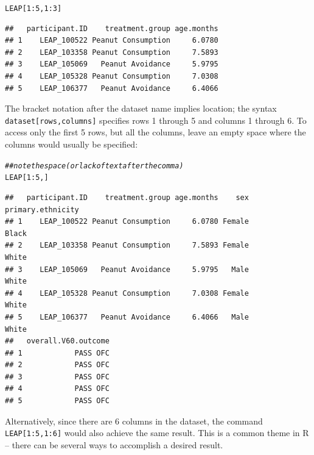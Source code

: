 \documentclass{report}\usepackage[]{graphicx}\usepackage[]{color}
\makeatletter
\newcommand{\hlnum}[1]{\textcolor[rgb]{0.686,0.059,0.569}{#1}}%
\newcommand{\hlcom}[1]{\textcolor[rgb]{0.678,0.584,0.686}{\textit{#1}}}%
\newcommand{\hlopt}[1]{\textcolor[rgb]{0,0,0}{#1}}%
\newcommand{\hlstd}[1]{\textcolor[rgb]{0.345,0.345,0.345}{#1}}%
\newenvironment{kframe}{%
 \def\at@end@of@kframe{}%
 \ifinner\ifhmode%
  \def\at@end@of@kframe{\end{minipage}}%
  \begin{minipage}{\columnwidth}%
 \fi\fi%
 \def\FrameCommand##1{\hskip\@totalleftmargin \hskip-\fboxsep
 \colorbox{shadecolor}{##1}\hskip-\fboxsep
     \hskip-\linewidth \hskip-\@totalleftmargin \hskip\columnwidth}%
 \MakeFramed {\advance\hsize-\width
   \@totalleftmargin\z@ \linewidth\hsize
   \@setminipage}}%
 {\par\unskip\endMakeFramed%
 \at@end@of@kframe}
\newenvironment{knitrout}{}{} %
\makeatother
\begin{document}
\begin{knitrout}
\color{fgcolor}\begin{kframe}
\begin{alltt}
\hlstd{LEAP[}\hlnum{1}\hlopt{:}\hlnum{5}\hlstd{,}\hlnum{1}\hlopt{:}\hlnum{3}\hlstd{]}
\end{alltt}
\begin{verbatim}
##   participant.ID    treatment.group age.months
## 1    LEAP_100522 Peanut Consumption     6.0780
## 2    LEAP_103358 Peanut Consumption     7.5893
## 3    LEAP_105069   Peanut Avoidance     5.9795
## 4    LEAP_105328 Peanut Consumption     7.0308
## 5    LEAP_106377   Peanut Avoidance     6.4066
\end{verbatim}
\end{kframe}
\end{knitrout}

The bracket notation after the dataset name implies location; the syntax \texttt{dataset[rows,columns]} specifies rows 1 through 5 and columns 1 through 6. To access only the first 5 rows, but all the columns, leave an empty space where the columns would usually be specified:

\begin{knitrout}
\color{fgcolor}\begin{kframe}
\begin{alltt}
\hlcom{## note the space (or lack of text after the comma)}
\hlstd{LEAP[}\hlnum{1}\hlopt{:}\hlnum{5}\hlstd{, ]}
\end{alltt}
\begin{verbatim}
##   participant.ID    treatment.group age.months    sex primary.ethnicity
## 1    LEAP_100522 Peanut Consumption     6.0780 Female             Black
## 2    LEAP_103358 Peanut Consumption     7.5893 Female             White
## 3    LEAP_105069   Peanut Avoidance     5.9795   Male             White
## 4    LEAP_105328 Peanut Consumption     7.0308 Female             White
## 5    LEAP_106377   Peanut Avoidance     6.4066   Male             White
##   overall.V60.outcome
## 1            PASS OFC
## 2            PASS OFC
## 3            PASS OFC
## 4            PASS OFC
## 5            PASS OFC
\end{verbatim}
\end{kframe}
\end{knitrout}

Alternatively, since there are 6 columns in the dataset, the command \texttt{LEAP[1:5,1:6]} would also achieve the same result. This is a common theme in \textsf{R} -- there can be several ways to accomplish a desired result. 
\end{document}

